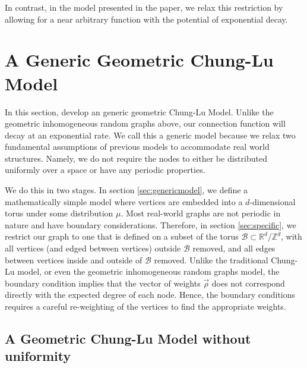 \documentclass[11]{article}
\newcommand{\Z}{\mathbb{Z}}
\newcommand{\R}{\mathbb{R}}
\newcommand{\rB}{\mathcal{B}}
\theoremstyle{remark}
\theoremstyle{definition}
\begin{document}
In contrast, in the model presented in the paper, we relax this restriction by allowing for a near arbitrary function with the potential of exponential decay. 

\section{A Generic Geometric Chung-Lu Model \label{sec:geommodel}} 

In this section, develop an generic geometric Chung-Lu Model. Unlike the geometric inhomogeneous random graphs above, our connection function will decay at an exponential rate. We call this a generic model because we relax two fundamental assumptions of previous models to accommodate real world structures. Namely, we do not require the nodes to either be distributed uniformly over a space or have any periodic properties.

We do this in two stages. In section \ref{sec:genericmodel}, we define a mathematically simple model where vertices are embedded into a $d$-dimensional torus under some distribution $\mu$. Most real-world graphs are not periodic in nature and have boundary considerations. Therefore, in section \ref{sec:specific}, we restrict our graph to one that is defined on a subset of the
torus $\rB \subset \R^d/ \Z^d$, with all vertices (and edged between vertices) outside $\rB$ removed, and all edges between vertices inside and outside of $\rB$ removed.
Unlike the traditional Chung-Lu model, { or even the geometric inhomogeneous random graphs model,} the boundary condition implies that the vector of weights $\vec{\rho}$ does not correspond directly with the expected degree of each node. Hence, the boundary conditions requires a careful re-weighting of the vertices to find the appropriate weights.


\subsection{A Geometric Chung-Lu Model without uniformity \label{sec:genericmodel}} 
\end{document}
